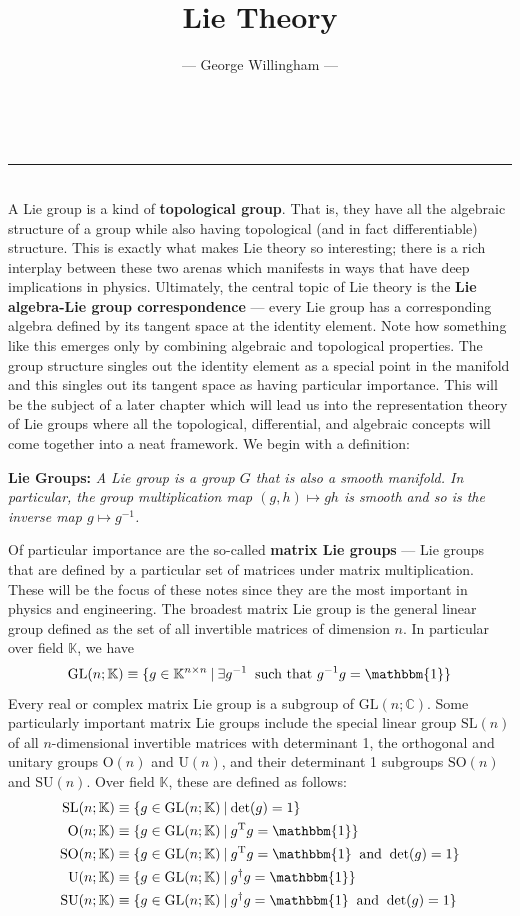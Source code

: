\documentclass{article}
\title{\textbf{Lie Theory}}
\author{--- George Willingham ---}
\date{}
\renewcommand{\t}[1]{\text{#1}}
\newcommand{\header}[1]{
	\vspace{1em}
	\noindent\raisebox{-0.5em}{\Large\textbf{#1}}\\
	\noindent\textcolor{MidnightBlue}{\rule{\textwidth}{2pt}}\\
}
\newcommand{\definition}[2]{
	\begin{center}
		\begin{tcolorbox}[colframe=MidnightBlue, colback=black!5, arc=2mm, outer arc=0.5mm, width=\linewidth, left=2mm, right=2mm]
			\textbf{#1:} \emph{#2}	
		\end{tcolorbox}
	\end{center}\noindent}
\begin{document}
	
	\maketitle
	\header{Matrix Lie Groups}
	\noindent A Lie group is a kind of \textbf{topological group}. That is, they have all the algebraic structure of a group while also having topological (and in fact differentiable) structure. This is exactly what makes Lie theory so interesting; there is a rich interplay between these two arenas which manifests in ways that have deep implications in physics. Ultimately, the central topic of Lie theory is the \textbf{Lie algebra-Lie group correspondence} --- every Lie group has a corresponding algebra defined by its tangent space at the identity element. Note how something like this emerges only by combining algebraic and topological properties. The group structure singles out the identity element as a special point in the manifold and this singles out its tangent space as having particular importance. This will be the subject of a later chapter which will lead us into the representation theory of Lie groups where all the topological, differential, and algebraic concepts will come together into a neat framework. We begin with a definition:
	\definition{Lie Groups}{A Lie group is a group $G$ that is also a smooth manifold. In particular, the group multiplication map $(g,h)\mapsto gh$ is smooth and so is the inverse map $g\mapsto g^{-1}$.}
	Of particular importance are the so-called \textbf{matrix Lie groups} --- Lie groups that are defined by a particular set of matrices under matrix multiplication. These will be the focus of these notes since they are the most important in physics and engineering. The broadest matrix Lie group is the general linear group defined as the set of all invertible matrices of dimension $n$. In particular over field $\mathbb{K}$, we have
	$$	\t{GL}(n;\mathbb{K}) \equiv \{g\in\mathbb{K}^{n\times n} \:|\:\exists g^{-1}\:\t{ such that } g^{-1}g = \mathbbm{1}\}$$
	Every real or complex matrix Lie group is a subgroup of $\t{GL}(n;\mathbb{C})$. Some particularly important matrix Lie groups include the special linear group $\t{SL}(n)$ of all $n$-dimensional invertible matrices with determinant 1, the orthogonal and unitary groups $\t{O}(n)$ and $\t{U}(n)$, and their determinant 1 subgroups $\t{SO}(n)$ and $\t{SU}(n)$. Over field $\mathbb{K}$, these are defined as follows:
	\begin{align*}
		\t{SL}(n;\mathbb{K}) &\equiv \{g \in \t{GL}(n;\mathbb{K}) \:|\: \t{det}(g)=1 \}\\
		\t{O}(n;\mathbb{K}) &\equiv \{ g\in\t{GL}(n;\mathbb{K}) \:|\: g^\t{T}g=\mathbbm{1} \} \\
		\t{SO}(n;\mathbb{K}) &\equiv \{ g\in \t{GL}(n;\mathbb{K}) \:|\:g^\t{T}g=\mathbbm{1} \:\t{ and }\: \t{det}(g)=1 \}\\
		\t{U}(n;\mathbb{K}) &\equiv \{ g\in \t{GL}(n;\mathbb{K}) \:|\: g^\dagger g=\mathbbm{1} \}\\
		\t{SU}(n;\mathbb{K}) &\equiv \{ g\in\t{GL}(n;\mathbb{K}) \:|\: g^\dagger g = \mathbbm{1}\:\t{ and }\:\t{det}(g)=1 \}
	\end{align*}
\end{document}
